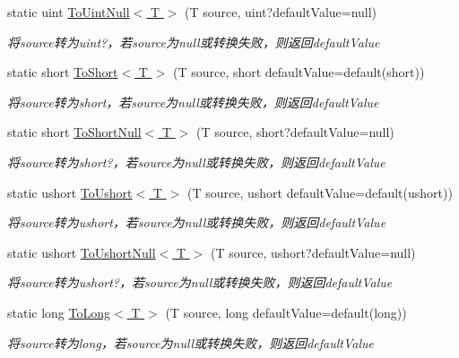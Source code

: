 \begin{DoxyCompactItemize}
static uint \hyperlink{class_x_c_l_net_tools_1_1_common_1_1_data_type_convert_ad25cb7c5c7757758ab91f2c006fcd4fa}{To\-Uint\-Null$<$ T $>$} (T source, uint?default\-Value=null)
\begin{DoxyCompactList}\small\item\em 将source转为uint?，若source为null或转换失败，则返回default\-Value \end{DoxyCompactList}\item 
static short \hyperlink{class_x_c_l_net_tools_1_1_common_1_1_data_type_convert_a2f311afdf05703ddfc64d2c897d39e1f}{To\-Short$<$ T $>$} (T source, short default\-Value=default(short))
\begin{DoxyCompactList}\small\item\em 将source转为short，若source为null或转换失败，则返回default\-Value \end{DoxyCompactList}\item 
static short \hyperlink{class_x_c_l_net_tools_1_1_common_1_1_data_type_convert_a0d6fbd193a532895a3acdaac21b25260}{To\-Short\-Null$<$ T $>$} (T source, short?default\-Value=null)
\begin{DoxyCompactList}\small\item\em 将source转为short?，若source为null或转换失败，则返回default\-Value \end{DoxyCompactList}\item 
static ushort \hyperlink{class_x_c_l_net_tools_1_1_common_1_1_data_type_convert_ae848ec8ce2c88dc9ee801ed64e761ca3}{To\-Ushort$<$ T $>$} (T source, ushort default\-Value=default(ushort))
\begin{DoxyCompactList}\small\item\em 将source转为ushort，若source为null或转换失败，则返回default\-Value \end{DoxyCompactList}\item 
static ushort \hyperlink{class_x_c_l_net_tools_1_1_common_1_1_data_type_convert_ad1d6c049665fe1be5a104f92c976d02e}{To\-Ushort\-Null$<$ T $>$} (T source, ushort?default\-Value=null)
\begin{DoxyCompactList}\small\item\em 将source转为ushort?，若source为null或转换失败，则返回default\-Value \end{DoxyCompactList}\item 
static long \hyperlink{class_x_c_l_net_tools_1_1_common_1_1_data_type_convert_a0fb66f094f40b602918778139b4cc9df}{To\-Long$<$ T $>$} (T source, long default\-Value=default(long))
\begin{DoxyCompactList}\small\item\em 将source转为long，若source为null或转换失败，则返回default\-Value \end{DoxyCompactList}\item 

\end{DoxyCompactItemize}
